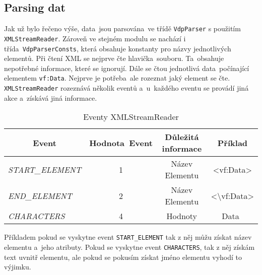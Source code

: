 \subsection{Parsing dat}
Jak už bylo řečeno výše, data~jsou parsována~ve třídě \texttt{VdpParser} s použitím \\ \texttt{XMLStreamReader}.
Zároveň ve stejném modulu se nachází i třída~\texttt{VdpParserConsts}, která obsahuje konstanty pro názvy jednotlivých elementů.
Při čtení XML se nejprve čte hlavička~souboru. Ta~obsahuje nepotřebné informace, které se ignorují.
Dále se čtou jednotlivá data~počínající elementem \texttt{vf:Data}.
Nejprve je potřeba~ale rozeznat jaký element se čte.
\texttt{XMLStreamReader} rozeznává několik eventů a~u~každého eventu se provádí jiná akce a~získává jiná informace.
\begin{table}[!h]
    \label{tab:xmlStreamReader}
    \centering
    \caption{Eventy XMLStreamReader}
    \begin{tabular}{|l|c|c|c|}
    \hline
    \multicolumn{1}{|c|}{\textbf{Event}} & \textbf{Hodnota~Event} & \textbf{Důležitá informace} & \textbf{Příklad}                                 \\ \hline
    \textit{START\_ELEMENT}              & 1                      & Název Elementu              & \textless{}vf:Data\textgreater{}                 \\ \hline
    \textit{END\_ELEMENT}                & 2                      & Název Elementu              & \textless{}\textbackslash{}vf:Data\textgreater{} \\ \hline
    \textit{CHARACTERS}                  & 4                      & Hodnoty                     & Data~                                            \\ \hline
    \end{tabular}
\end{table}

Příkladem pokud se vyskytne event \texttt{START\_ELEMENT} tak z něj můžu získat název elementu a~jeho atributy.
Pokud se vyskytne event \texttt{CHARACTERS}, tak z něj získám text uvnitř elementu, ale pokud se pokusím získat jméno elementu vyhodí to výjimku.

